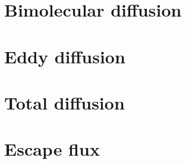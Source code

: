 \section{Bimolecular diffusion}


\section{Eddy diffusion}


\section{Total diffusion}


\section{Escape flux}

